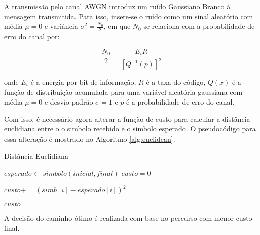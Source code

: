A transmissão pelo canal AWGN introduz um ruído Gaussiano Branco à mensagem transmitida. Para isso, insere-se o ruído como um sinal aleatório com média $\mu = 0$ e variância $\sigma^{2} = \frac{N_{0}}{2}$, em que $N_{0}$ se relaciona com a probabilidade de erro do canal por:

\begin{equation}
	\frac{N_{0}}{2} = \frac{E_{i} R}{[Q^{-1}(p)]^{2}}
\end{equation}

\noindent
onde $E_{i}$ é a energia por bit de informação, $R$ é a taxa do código, $Q(x)$ é a função de distribuição acumulada para uma variável aleatória gaussiana com média $\mu = 0$ e desvio padrão $\sigma=1$ e $p$ é a probabilidade de erro do canal.

Com isso, é necessário agora alterar a função de custo para calcular a distância euclidiana entre o o simbolo recebido e o simbolo esperado. O pseudocódigo para essa alteração é mostrado no Algoritmo \ref{alg:euclidean}.

\begin{algorithm}[h!]
	\caption{Distância Euclidiana}
	\label{alg:euclidean}
	\begin{algorithmic}
		\State $esperado \gets simbolo(inicial, final)$
		\State $custo = 0$
		
		\State $custo += (simb[i] - esperado[i])^{2}$
		\EndFor
		
		\Return $custo$
		\EndProcedure
	\end{algorithmic}
\end{algorithm}

A decisão do caminho ótimo é realizada com base no percurso com menor custo final.


